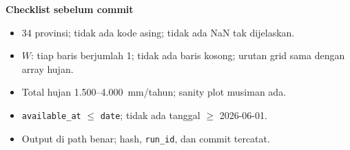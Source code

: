 \documentclass[9pt,a4paper]{extarticle}
\newcommand{\code}[1]{\texttt{\small\color{ink}#1}}
\begin{document}
\begin{tcolorbox}[enhanced,colback=bg,colframe=bg,boxrule=0pt,arc=1mm,left=3mm,right=3mm,top=2mm,bottom=2mm]
{\sffamily\bfseries\color{ink}Checklist sebelum commit}
\begin{itemize}[leftmargin=1.35em,itemsep=0.1pt,topsep=1pt,font=\footnotesize]
  \item[$\square$] 34 provinsi; tidak ada kode asing; tidak ada NaN tak dijelaskan.
  \item[$\square$] $W$: tiap baris berjumlah 1; tidak ada baris kosong; urutan grid sama dengan array hujan.
  \item[$\square$] Total hujan 1.500--4.000~mm/tahun; sanity plot musiman ada.
  \item[$\square$] \code{available\_at} $\le$ \code{date}; tidak ada tanggal $\ge$ 2026-06-01.
  \item[$\square$] Output di path benar; hash, \code{run\_id}, dan commit tercatat.
\end{itemize}
\end{tcolorbox}
\end{document}
